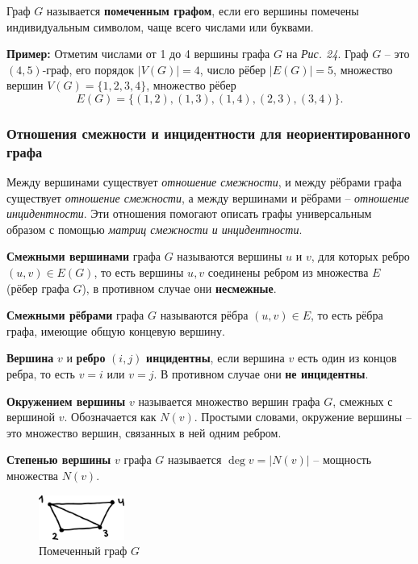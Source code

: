 \documentclass[12pt, a4paper]{article}
\begin{document}
Граф $G$ называется \textbf{помеченным графом}, если его вершины помечены индивидуальным символом, чаще всего числами или буквами.

\textbf{Пример:} Отметим числами от 1 до 4 вершины графа $G$ на \textit{Рис. 24}. Граф $G$ -- это $(4,5)$-граф, его порядок $|V(G)| = 4$, число рёбер $|E(G)| = 5$, множество вершин $V(G) = \{ 1, 2, 3, 4 \}$, множество рёбер
\[E(G) = \{ (1,2),(1,3),(1,4),(2,3),(3,4) \}. \]

\subsubsection{Отношения смежности и инцидентности для неориентированного графа}

Между вершинами существует \textit{отношение смежности}, и между рёбрами графа существует \textit{отношение смежности}, а между вершинами и рёбрами -- \textit{отношение инцидентности}. Эти отношения помогают описать графы универсальным образом с помощью \textit{матриц смежности и инцидентности}.

\textbf{Смежными вершинами} графа $G$ называются вершины $u$ и $v$, для которых ребро $(u,v) \in E(G)$, то есть вершины $u,v$ соединены ребром из множества $E$ (рёбер графа $G$), в противном случае они \textbf{несмежные}.

\textbf{Смежными рёбрами} графа $G$ называются рёбра $(u,v) \in E$, то есть рёбра графа, имеющие общую концевую вершину.

\textbf{Вершина} $v$ и \textbf{ребро} $(i,j)$ \textbf{инцидентны}, если вершина $v$ есть один из концов ребра, то есть $v=i$ или $v=j$. В противном случае они \textbf{не инцидентны}.

\textbf{Окружением вершины} $v$ называется множество вершин графа $G$, смежных с вершиной $v$. Обозначается как $N(v)$. Простыми словами, окружение вершины -- это множество вершин, связанных в ней одним ребром.

\textbf{Степенью вершины} $v$ графа $G$ называется $\deg v = |N(v)|$ -- мощность множества $N(v)$.

\begin{figure}
  \centering
  \vspace{2cm}
  \includegraphics[width=0.25\textwidth]{26}
  \vspace{-4mm}
  \caption{Помеченный граф $G$}
\end{figure}
\end{document}
